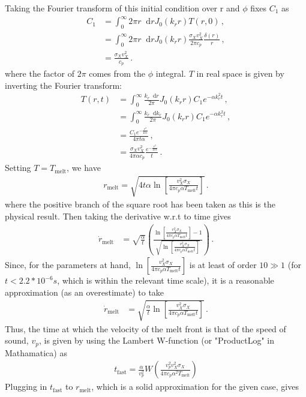 \documentclass[prd,reprint,10pt]{revtex4-1}
\newcommand*\diff{\mathop{}\!\mathrm{d}}
\newcommand*\te[1]{\text{#1}}
\newcommand*\p[1]{\left(#1\right)}
\newcommand*\ps[1]{\left[#1\right]}
\newcommand*\f[2]{\frac{#1}{#2}}
\begin{document}
Taking the Fourier transform of this initial condition over r and $\phi$ fixes $C_1$ as 
\begin{align}
C_1 &= \int_0^\infty 2\pi r\diff r J_0 (k_r r) T(r,0) \,,\\
&= \int_0^\infty 2\pi r\diff r J_0 (k_r r) \f{\sigma_{X} v_X^2}{2\pi c_p}\f{\delta(r)}{r} \,,\\
&=\f{\sigma_{X} v_X^2}{c_p}\,.
\end{align}
where the factor of $2 \pi$ comes from the $\phi$ integral.
$T$ in real space is given by inverting the Fourier transform:
\begin{align}
T(r,t) &=\int_0^\infty \f{k_r\diff r}{2\pi} J_0(k_r r) C_1 e^{-\alpha k_r^2 t}\,,\\
&=\int_0^\infty \f{k_r\diff k_r}{2\pi} J_0(k_r r) C_1 e^{-\alpha k_r^2 t}\,,\\
&=\f{C_1 e^{-\f{r^2}{4t\alpha}}}{4\pi t\alpha}\,,\\
&=\f{\sigma_{X} v_X^2}{4\pi \alpha c_p}\f{e^{-\f{r^2}{4t\alpha}}}{t}\,.
\end{align}
Setting $T = T_\te{melt}$, we have
\begin{align}
r_\te{melt} = \sqrt{4t\alpha\ln\ps{\f{v_X^2\sigma_X}{4 \pi c_p \alpha T_\te{melt} t}}}\,.
\end{align}
where the positive branch of the square root has been taken as this is the physical result. Then taking the derivative w.r.t to time gives
\begin{align}
\dot r_\te{melt} &=\sqrt{\f{\alpha}{t}}\p{\f{\ln\ps{\f{v_X^2\sigma_X}{4 \pi c_p \alpha T_\te{melt} t}} - 1}{\sqrt{\ln\ps{\f{v_X^2\sigma_X}{4 \pi c_p \alpha T_\te{melt} t}}}}}\,.
\end{align}
Since, for the parameters at hand, $\ln\ps{\f{v_X^2\sigma_X}{4 \pi c_p \alpha T_\te{melt} t}}$ is at least of order $10 \gg 1$ (for $t < 2.2*10^{-6} s$, which is within the relevant time scale), it is a reasonable approximation (as an overestimate) to take
\begin{align}
\dot r_\te{melt} &=\sqrt{\f{\alpha}{t}\ln\ps{\f{v_X^2\sigma_X}{4 \pi c_p \alpha T_\te{melt} t}}}\,.
\end{align}
Thus, the time at which the velocity of the melt front is that of the speed of sound, $v_p$, is given by using the Lambert W-function (or "ProductLog" in Mathamatica) as
\begin{align}
t_{\te{fast}} = \f{\alpha}{v_p^2}W\p{\frac{v_p^2 v_X^2 \sigma_X}{4 \pi c_p \alpha^2 T_\te{melt}}}
\end{align}
Plugging in $t_{\te{fast}}$ to $r_\te{melt}$, which is a solid approximation for the given case, gives
\end{document}
